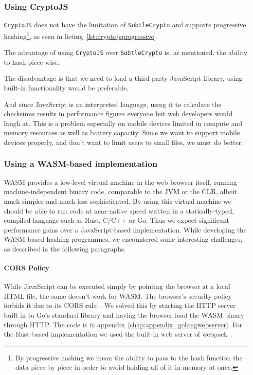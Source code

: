 \subsubsection{Using CryptoJS}
\label{subsec:cryptojs}
\texttt{CryptoJS} does not have the limitation of \texttt{SubtleCrypto} and supports progressive hashing\footnote{
By progressive hashing we mean the ability to pass to the hash function the data piece by piece in order to avoid holding all of it in memory at once.},
as seen in listing~\ref{lst:cryptojsprogressive}.



The advantage of using \texttt{CryptoJS} over \texttt{SubtleCrypto} is, as mentioned, the ability to hash piece-wise.

The disadvantage is that we need to load a third-party JavaScript library, using built-in functionality would be preferable.

And since JavaScript is an interpreted language, using it to calculate the checksums results in performance figures everyone but web developers would laugh at.
This is a problem especially on mobile devices limited in compute and memory resources as well as battery capacity.
Since we want to support mobile devices properly, and don't want to limit users to small files, we must do better.

\subsubsection{Using a WASM-based implementation}
\label{subsec:wasmhashing}
\gls{WASM} provides a low-level virtual machine in the web browser itself,
running machine-independent binary code, comparable to the \gls{JVM} or the \gls{CLR},
albeit much simpler and much less sophisticated.
By using this virtual machine we should be able to run code at near-native speed written in a statically-typed, compiled language such as Rust, C/C++ or Go.
Thus we expect significant performance gains over a JavaScript-based implementation.
While developing the \gls{WASM}-based hashing programmes, we encountered some interesting challenges, as described in the following paragraphs.

\paragraph{CORS Policy} While JavaScript can be executed simply by pointing the browser at a local \gls{HTML} file, the same doesn't work for \gls{WASM}.
The browser's security policy forbids it due to its \gls{CORS} rule~\cite{cors}.
We solved this by starting the \gls{HTTP} server built in to Go's standard library and having the browser load the \gls{WASM} binary through \gls{HTTP}.
The code is in appendix~\ref{chap:appendix_golangwebserver}.
For the Rust-based implementation we used the built-in web server of webpack~\cite{webpack}.

